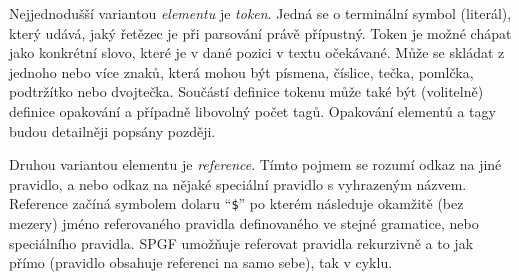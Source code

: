 \begin{center}
\end{center}

Nejjednodušší variantou \emph{elementu} je \emph{token}.
Jedná se o terminální symbol (literál), který udává, jaký řetězec je při parsování právě přípustný.
Token je možné chápat jako konkrétní slovo, které je v dané pozici v textu očekávané.
Může se skládat z jednoho nebo více znaků, která mohou být písmena, číslice, tečka, pomlčka, podtržítko nebo dvojtečka.
Součástí definice tokenu může také být (volitelně) definice opakování a případně libovolný počet tagů.
Opakování elementů a tagy budou detailněji popsány později.

Druhou variantou elementu je \emph{reference}.
Tímto pojmem se rozumí odkaz na jiné pravidlo, a nebo odkaz na nějaké speciální pravidlo s vyhrazeným názvem.
Reference začíná symbolem dolaru \enquote{\texttt{\$}} po kterém následuje okamžitě (bez mezery) jméno referovaného
pravidla definovaného ve stejné gramatice, nebo speciálního pravidla.
SPGF umožňuje referovat pravidla rekurzivně a to jak přímo (pravidlo obsahuje referenci na samo sebe), tak v cyklu.

